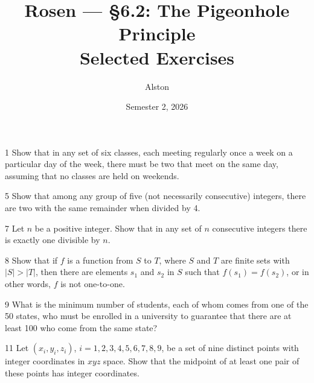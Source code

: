 \documentclass[11pt]{article}
\title{Rosen --- \S 6.2: The Pigeonhole Principle\\ \large Selected Exercises}
\author{Alston}
\date{Semester 2, 2026}
\begin{document}
\maketitle

\begin{exercise}{1}
    Show that in any set of six classes, each meeting regularly once a
    week on a particular day of the week, there must be two that meet
    on the same day, assuming that no classes are held on weekends.
\end{exercise}

\begin{exercise}{5}
    Show that among any group of five (not necessarily consecutive)
    integers, there are two with the same remainder when divided by
    4.
\end{exercise}

\begin{exercise}{7}
    Let $n$ be a positive integer. Show that in any set of $n$
    consecutive integers there is exactly one divisible by $n$.
\end{exercise}

\begin{exercise}{8}
    Show that if $f$ is a function from $S$ to $T$, where $S$ and $T$
    are finite sets with $|S| > |T|$, then there are elements $s_1$
    and $s_2$ in $S$ such that $f(s_1) = f(s_2)$, or in other words,
    $f$ is not one-to-one.
\end{exercise}

\begin{exercise}{9}
    What is the minimum number of students, each of whom comes from
    one of the 50 states, who must be enrolled in a university to
    guarantee that there are at least 100 who come from the same
    state?
\end{exercise}

\begin{exercise}{11}
    Let $(x_i, y_i, z_i)$, $i = 1, 2, 3, 4, 5, 6, 7, 8, 9$, be a set
    of nine distinct points with integer coordinates in $xyz$ space.
    Show that the midpoint of at least one pair of these points has
    integer coordinates.
\end{exercise}
\end{document}
